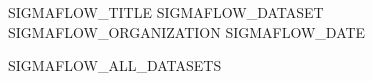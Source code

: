 \documentclass[12pt]{article}
\begin{document}
\capasigmaflow
    {SIGMAFLOW_TITLE}
    {SIGMAFLOW_DATASET}
    {SIGMAFLOW_ORGANIZATION}
    {SIGMAFLOW_DATE}

\tableofcontents
\newpage




SIGMAFLOW_ALL_DATASETS



\end{document}
